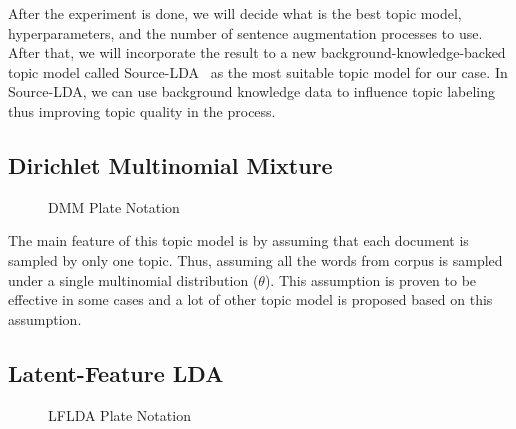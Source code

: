 \documentclass[senior]{IPSstyle}
\begin{document}
After the experiment is done, we will decide what is the best topic model, hyperparameters, and the number of sentence augmentation processes to use. After that, we will incorporate the result to a new background-knowledge-backed topic model called Source-LDA~\cite{wood} as the most suitable topic model for our case. In Source-LDA, we can use background knowledge data to influence topic labeling thus improving topic
quality in the process.

\subsection{Dirichlet Multinomial Mixture~\cite{yin}}

\begin{figure}[h]
	\centering
	\caption{DMM Plate Notation}
\label{fig_dmm}
\end{figure}

The main feature of this topic model is by assuming that each document is sampled by only one topic. Thus, assuming all the words from corpus is sampled under a single multinomial distribution ($\theta$). This assumption is proven to be effective in some cases and a lot of other topic model is proposed based on this assumption.

\subsection{Latent-Feature LDA~\cite{nguyen}}

\begin{figure}[h]
	\centering
	\caption{LFLDA Plate Notation}
\label{fig_lflda}
\end{figure}
\end{document}
